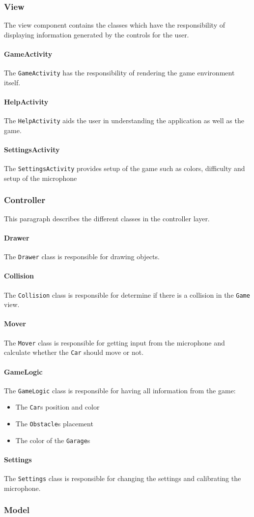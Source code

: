 \subsubsection{View}
The view component contains the classes which have the responsibility of displaying information generated by the controls for the user.

\paragraph{GameActivity} The \lstinline!GameActivity! has the responsibility of rendering the game environment itself. 

\paragraph{HelpActivity} The \lstinline!HelpActivity! aids the user in understanding the application as well as the game. 

\paragraph{SettingsActivity} The \lstinline!SettingsActivity! provides setup of the game such as colors, difficulty and setup of the microphone

\subsubsection{Controller}
This paragraph describes the different classes in the controller layer.
\paragraph{Drawer}
The \lstinline!Drawer! class is responsible for drawing objects.
\paragraph{Collision}
The \lstinline!Collision! class is responsible for determine if there is a collision in the \lstinline!Game! view.
\paragraph{Mover}
The \lstinline!Mover! class is responsible for getting input from the microphone and calculate whether the \lstinline!Car! should move or not.
\paragraph{GameLogic}
The \lstinline!GameLogic! class is responsible for having all information from the game:
\begin{itemize}
\item The \lstinline!Car!s position and color
\item The \lstinline!Obstacle!s placement
\item The color of the \lstinline!Garage!s
\end{itemize}
\paragraph{Settings}
The \lstinline!Settings! class is responsible for changing the settings and calibrating the microphone.
\subsubsection{Model}
